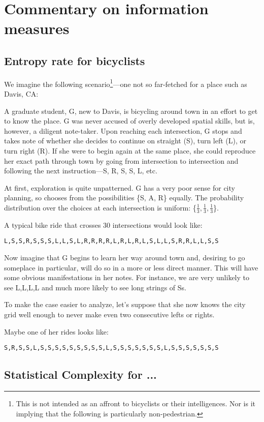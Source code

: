 \ifx\master\undefined\fi


\chapter{Commentary on information measures}
\label{app:commentary}

\section{Entropy rate for bicyclists}

We imagine the following scenario\footnote{This is not intended as an affront to bicyclists or their intelligences. Nor is it implying that the following is particularly non-pedestrian.}---one not so far-fetched for a place such as Davis, CA:

A graduate student, G, new to Davis, is bicycling around town in an effort to get to know the place. G was never accused of overly developed spatial skills, but is, however, a diligent note-taker. Upon reaching each intersection, G stops and takes note of whether she decides to continue on straight (S), turn left (L), or turn right (R). If she were to begin again at the same place, she could reproduce her exact path through town by going from intersection to intersection and following the next instruction---S, R, S, S, L, etc.

At first, exploration is quite unpatterned. G has a very poor sense for city planning, so chooses from the possibilities \{S, A, R\} equally. The probability distribution over the choices at each intersection is uniform: \{$\frac{1}{3}, \frac{1}{3}, \frac{1}{3}$\}.

A typical bike ride that crosses 30 intersections would look like:
\begin{verbatim}
L,S,S,R,S,S,S,L,L,S,L,R,R,R,R,L,R,L,R,L,S,L,L,S,R,R,L,L,S,S
\end{verbatim}

Now imagine that G begins to learn her way around town and, desiring to go someplace in particular, will do so in a more or less direct manner. This will have some obvious manifestations in her notes. For instance, we are very unlikely to see L,L,L,L and much more likely to see long strings of Ss.

To make the case easier to analyze, let's suppose that she now knows the city grid well enough to never make even two consecutive lefts or rights.

Maybe one of her rides looks like:
\begin{verbatim}
S,R,S,S,L,S,S,S,S,S,S,S,S,S,L,S,S,S,S,S,S,S,L,S,S,S,S,S,S,S
\end{verbatim}

\section{Statistical Complexity for ...}

\ifx\master\undefined\fi

